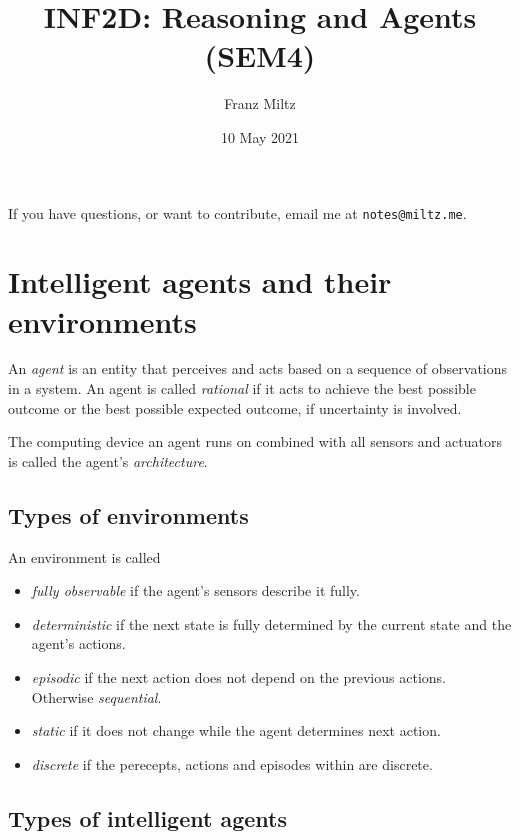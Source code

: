 \documentclass{article}
\title{INF2D: Reasoning and Agents (SEM4)}
\author{Franz Miltz}
\date{10 May 2021}
\begin{document}
\maketitle
\noindent If you have questions, or want to contribute, email me at \texttt{notes@miltz.me}.
\tableofcontents
\pagebreak

\section{Intelligent agents and their environments}

\begin{definition}
	An \emph{agent} is an entity that perceives and
	acts based on a sequence of observations in a system.
	An agent is called \emph{rational} if it acts to achieve
	the best possible outcome or the best possible expected
	outcome, if uncertainty is involved.

	The computing device an agent runs on combined with all sensors and actuators
	is called the agent's \emph{architecture}.
\end{definition}

\subsection{Types of environments}

\begin{definition}[R\&N p. 42]
	An environment is called
	\begin{itemize}
		\item \emph{fully observable} if the agent's sensors describe it fully.
		\item \emph{deterministic} if the next state is fully
		      determined by the current state and the agent's actions.
		\item \emph{episodic} if the next action does not depend on the previous
		      actions. Otherwise \emph{sequential}.
		\item \emph{static} if it does not change while the agent determines
		      next action.
		\item \emph{discrete} if the perecepts, actions and episodes within
		      are discrete.
	\end{itemize}
\end{definition}

\subsection{Types of intelligent agents}
\end{document}
